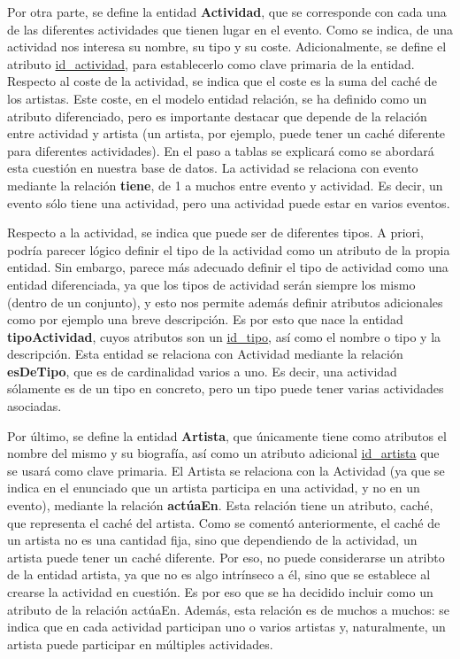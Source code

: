 \documentclass[a4paper,onecolumn]{article}
\begin{document}
\begin{sloppypar}
Por otra parte, se define la entidad \textbf{Actividad}, que se corresponde con cada una de las diferentes actividades que tienen lugar en el evento.
Como se indica, de una actividad nos interesa su nombre, su tipo y su coste. Adicionalmente, se define el atributo \underline{id\_actividad}, para 
establecerlo como clave primaria de la entidad. Respecto al coste de la actividad, se indica que el coste es la suma del caché de los artistas. 
Este coste, en el modelo entidad relación, se ha definido como un atributo diferenciado, pero es importante destacar que depende de la relación entre
actividad y artista (un artista, por ejemplo, puede tener un caché diferente para diferentes actividades). En el paso a tablas se 
explicará como se abordará esta cuestión en nuestra base de datos. La actividad se relaciona con evento mediante la relación \textbf{tiene}, de 1 a 
muchos entre evento y actividad. Es decir, un evento sólo tiene una actividad, pero una actividad puede estar en varios eventos.

Respecto a la actividad, se indica que puede ser de diferentes tipos. A priori, podría parecer lógico definir el tipo de la actividad como un atributo 
de la propia entidad. Sin embargo, parece más adecuado definir el tipo de actividad como una entidad diferenciada, ya que los tipos de actividad 
serán siempre los mismo (dentro de un conjunto), y esto nos permite además definir atributos adicionales como por ejemplo una breve descripción. Es 
por esto que nace la entidad \textbf{tipoActividad}, cuyos atributos son un \underline{id\_tipo}, así como el nombre o tipo y la descripción. Esta 
entidad se relaciona con Actividad mediante la relación \textbf{esDeTipo}, que es de cardinalidad varios a uno. Es decir, una actividad sólamente es 
de un tipo en concreto, pero un tipo puede tener varias actividades asociadas.

Por último, se define la entidad \textbf{Artista}, que únicamente tiene como atributos el nombre del mismo y su biografía, así como un atributo 
adicional \underline{id\_artista} que se usará como clave primaria. El Artista se relaciona con la Actividad (ya que se indica en el enunciado que 
un artista participa en una actividad, y no en un evento), mediante la relación \textbf{actúaEn}. Esta relación tiene un atributo, caché, que 
representa el caché del artista. Como se comentó anteriormente, el caché de un artista no es una cantidad fija, sino que dependiendo de la actividad, 
un artista puede tener un caché diferente. Por eso, no puede considerarse un atribto de la entidad artista, ya que no es algo intrínseco a él, 
sino que se establece al crearse la actividad en cuestión. Es por eso que se ha decidido incluir como un atributo de la relación actúaEn. Además, esta 
relación es de muchos a muchos: se indica que en cada actividad participan uno o varios artistas y, naturalmente, un artista puede participar
en múltiples actividades.



\end{sloppypar}
\end{document}

